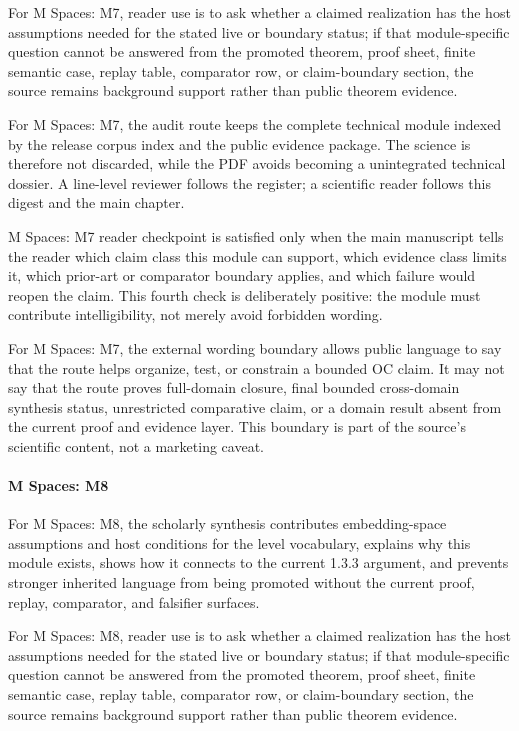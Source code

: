 For M Spaces: M7, reader use is to ask whether a claimed realization has the host assumptions needed for the stated live or boundary status; if that module-specific question cannot be answered from the promoted theorem, proof sheet, finite semantic case, replay table, comparator row, or claim-boundary section, the source remains background support rather than public theorem evidence.


For M Spaces: M7, the audit route keeps the complete technical module indexed by the release corpus index and the public evidence package. The science is therefore not discarded, while the PDF avoids becoming a unintegrated technical dossier. A line-level reviewer follows the register; a scientific reader follows this digest and the main chapter.


M Spaces: M7 reader checkpoint is satisfied only when the main manuscript tells the reader which claim class this module can support, which evidence class limits it, which prior-art or comparator boundary applies, and which failure would reopen the claim. This fourth check is deliberately positive: the module must contribute intelligibility, not merely avoid forbidden wording.


For M Spaces: M7, the external wording boundary allows public language to say that the route helps organize, test, or constrain a bounded OC claim. It may not say that the route proves full-domain closure, final bounded cross-domain synthesis status, unrestricted comparative claim, or a domain result absent from the current proof and evidence layer. This boundary is part of the source's scientific content, not a marketing caveat.


\paragraph{M Spaces: M8}

For M Spaces: M8, the scholarly synthesis contributes embedding-space assumptions and host conditions for the level vocabulary, explains why this module exists, shows how it connects to the current 1.3.3 argument, and prevents stronger inherited language from being promoted without the current proof, replay, comparator, and falsifier surfaces.


For M Spaces: M8, reader use is to ask whether a claimed realization has the host assumptions needed for the stated live or boundary status; if that module-specific question cannot be answered from the promoted theorem, proof sheet, finite semantic case, replay table, comparator row, or claim-boundary section, the source remains background support rather than public theorem evidence.


